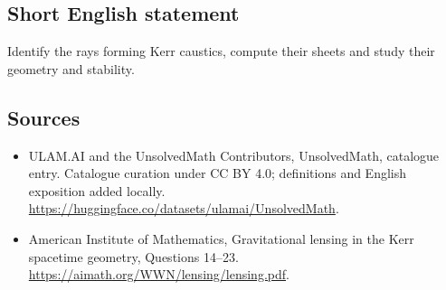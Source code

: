 \documentclass[11pt]{article}
\begin{document}
\subsection{Short English statement}
Identify the rays forming Kerr caustics, compute their sheets and study their geometry and stability.
\subsection{Sources}
\begin{itemize}
\item[\hypertarget{source:statement:1}{S1}] ULAM.AI and the UnsolvedMath Contributors, UnsolvedMath, catalogue entry. Catalogue curation under CC BY 4.0; definitions and English exposition added locally.
\url{https://huggingface.co/datasets/ulamai/UnsolvedMath}.
\item[\hypertarget{source:statement:2}{S2}] American Institute of Mathematics, Gravitational lensing in the Kerr spacetime geometry, Questions 14–23.
\url{https://aimath.org/WWN/lensing/lensing.pdf}.
\end{itemize}
\label{end:statement}
\end{document}
